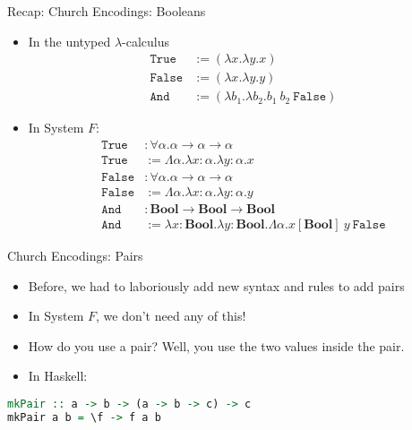 \documentclass[leqno,presentation,usenames,dvipsnames]{beamer}
\newcommand{\bool}{\textbf{Bool}}
\begin{document}
\begin{frame}[fragile]{Recap: Church Encodings: Booleans}
    \begin{itemize}
        \item In the untyped $\lambda$-calculus
            \begin{align*}
                \texttt{True} & := (\lambda x. \lambda y. x) \\
                \texttt{False} & := (\lambda x. \lambda y. y) \\
                \texttt{And} & := (\lambda b_1. \lambda b_2. b_1~b_2~\texttt{False})
            \end{align*}
        \item In System $F$:
            \begin{align*}
                \texttt{True} & : \forall \alpha. \alpha \to \alpha \to \alpha \\
                \texttt{True} & := \Lambda \alpha. \lambda x : \alpha. \lambda y : \alpha. x \\
                \texttt{False} & : \forall \alpha. \alpha \to \alpha \to \alpha \\
                \texttt{False} & := \Lambda \alpha. \lambda x : \alpha. \lambda y : \alpha. y \\
                \texttt{And} & : \bool \to \bool \to \bool \\
                \texttt{And} & := \lambda x : \bool. \lambda y: \bool. \Lambda \alpha. x[\bool]~y~\texttt{False}
            \end{align*}
    \end{itemize}
\end{frame}

\begin{frame}[fragile]{Church Encodings: Pairs}
    \begin{itemize}
        \item Before, we had to laboriously add new syntax and rules to add pairs
        \item In System $F$, we don't need any of this!
        \item How do you use a pair? Well, you use the two values inside the pair.
        \item In Haskell:
    \end{itemize}
\begin{lstlisting}[language=haskell, basicstyle=\small\ttfamily]
mkPair :: a -> b -> (a -> b -> c) -> c
mkPair a b = \f -> f a b
\end{lstlisting}
\end{frame}
\end{document}

